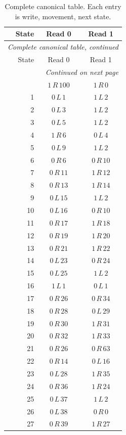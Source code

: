 \small
\setlength{\tabcolsep}{13pt}
\begin{longtable}{rcc}
\caption{Complete canonical table. Each entry is write, movement, next state.}\label{tab:complete}\\
\toprule State & Read 0 & Read 1\\\midrule
\endfirsthead
\multicolumn{3}{l}{\small\itshape Complete canonical table, continued}\\
\toprule State & Read 0 & Read 1\\\midrule
\endhead
\midrule\multicolumn{3}{r}{\small\itshape Continued on next page}\\
\endfoot
\bottomrule
\endlastfoot
0 & $1\,R\,100$ & $1\,R\,0$\\
1 & $0\,L\,1$ & $1\,L\,2$\\
2 & $0\,L\,3$ & $1\,L\,2$\\
3 & $0\,L\,5$ & $1\,L\,2$\\
4 & $1\,R\,6$ & $0\,L\,4$\\
5 & $0\,L\,9$ & $1\,L\,2$\\
6 & $0\,R\,6$ & $0\,R\,10$\\
7 & $0\,R\,11$ & $1\,R\,12$\\
8 & $0\,R\,13$ & $1\,R\,14$\\
9 & $0\,L\,15$ & $1\,L\,2$\\
10 & $0\,L\,16$ & $0\,R\,10$\\
11 & $0\,R\,17$ & $1\,R\,18$\\
12 & $0\,R\,19$ & $1\,R\,20$\\
13 & $0\,R\,21$ & $1\,R\,22$\\
14 & $0\,L\,23$ & $0\,R\,24$\\
15 & $0\,L\,25$ & $1\,L\,2$\\
16 & $1\,L\,1$ & $0\,L\,1$\\
17 & $0\,R\,26$ & $0\,R\,34$\\
18 & $0\,R\,28$ & $0\,L\,29$\\
19 & $0\,R\,30$ & $1\,R\,31$\\
20 & $0\,R\,32$ & $1\,R\,33$\\
21 & $0\,R\,26$ & $0\,R\,63$\\
22 & $0\,R\,14$ & $0\,L\,16$\\
23 & $0\,L\,28$ & $1\,R\,35$\\
24 & $0\,R\,36$ & $1\,R\,24$\\
25 & $0\,L\,37$ & $1\,L\,2$\\
26 & $0\,L\,38$ & $0\,R\,0$\\
27 & $0\,R\,39$ & $1\,R\,27$\\

\end{longtable}

